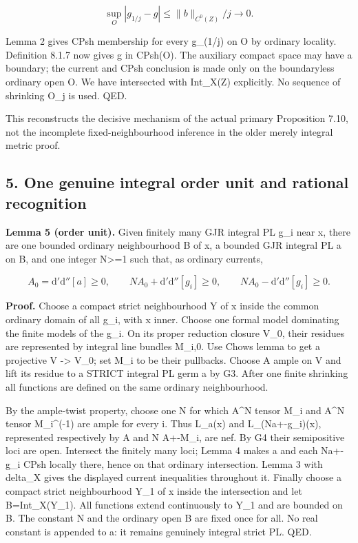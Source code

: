 \documentclass[
  11pt,
]{article}
\newcommand{\ddc}{\mathrm d'\mathrm d''}
\begin{document}
\[
\sup_O|g_{1/j}-g|\le\|b\|_{C^0(Z)}/j\longrightarrow0.
\]

Lemma 2 gives CPsh membership for every g\_(1/j) on O by ordinary
locality. Definition 8.1.7 now gives g in CPsh(O). The auxiliary compact
space may have a boundary; the current and CPsh conclusion is made only
on the boundaryless ordinary open O. We have intersected with Int\_X(Z)
explicitly. No sequence of shrinking O\_j is used. QED.

This reconstructs the decisive mechanism of the actual primary
Proposition 7.10, not the incomplete fixed-neighbourhood inference in
the older merely integral metric proof.

\subsection{5. One genuine integral order unit and rational
recognition}\label{one-genuine-integral-order-unit-and-rational-recognition}

\textbf{Lemma 5 (order unit).} Given finitely many GJR integral PL g\_i
near x, there are one bounded ordinary neighbourhood B of x, a bounded
GJR integral PL a on B, and one integer N\textgreater=1 such that, as
ordinary currents,

\[
A_0=\ddc[a]\ge0,\qquad NA_0+\ddc[g_i]\ge0,\qquad NA_0-\ddc[g_i]\ge0.
\]

\textbf{Proof.} Choose a compact strict neighbourhood Y of x inside the
common ordinary domain of all g\_i, with x inner. Choose one formal
model dominating the finite models of the g\_i. On its proper reduction
closure V\_0, their residues are represented by integral line bundles
M\_i,0. Use Chow\textquotesingle s lemma to get a projective V
-\textgreater{} V\_0; set M\_i to be their pullbacks. Choose A ample on
V and lift its residue to a STRICT integral PL germ a by G3. After one
finite shrinking all functions are defined on the same ordinary
neighbourhood.

By the ample-twist property, choose one N for which A\^{}N tensor M\_i
and A\^{}N tensor M\_i\^{}(-1) are ample for every i. Thus L\_a(x) and
L\_(Na+-g\_i)(x), represented respectively by A and N A+-M\_i, are nef.
By G4 their semipositive loci are open. Intersect the finitely many
loci; Lemma 4 makes a and each Na+-g\_i CPsh locally there, hence on
that ordinary intersection. Lemma 3 with delta\_X gives the displayed
current inequalities throughout it. Finally choose a compact strict
neighbourhood Y\_1 of x inside the intersection and let B=Int\_X(Y\_1).
All functions extend continuously to Y\_1 and are bounded on B. The
constant N and the ordinary open B are fixed once for all. No real
constant is appended to a: it remains genuinely integral strict PL. QED.
\end{document}
